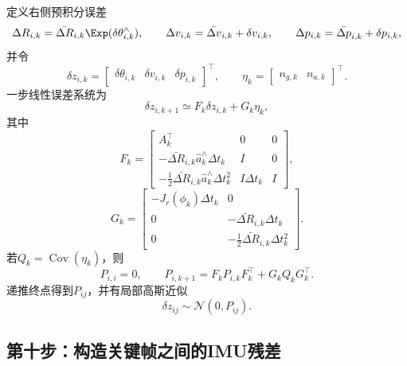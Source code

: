 定义右侧预积分误差
\[
    \Delta R_{i,k}
    =\bar{\Delta R}_{i,k}\Exp(\delta\theta_{i,k}^\wedge),
    \qquad
    \Delta v_{i,k}=\bar{\Delta v}_{i,k}+\delta v_{i,k},
    \qquad
    \Delta p_{i,k}=\bar{\Delta p}_{i,k}+\delta p_{i,k},
\]
并令
\[
    \delta z_{i,k}
    =\begin{bmatrix}\delta\theta_{i,k}&\delta v_{i,k}&\delta p_{i,k}\end{bmatrix}^\top,
    \qquad
    \eta_k
    =\begin{bmatrix}n_{g,k}&n_{a,k}\end{bmatrix}^\top.
\]
一步线性误差系统为
\[
    \delta z_{i,k+1}
    \simeq F_k\delta z_{i,k}+G_k\eta_k,
\]
其中
\[
\boxed{
F_k=
\begin{bmatrix}
    A_k^\top & 0 & 0\\
    -\bar{\Delta R}_{i,k}\widehat a_k^\wedge\Delta t_k
        & I & 0\\
    -\frac12\bar{\Delta R}_{i,k}\widehat a_k^\wedge\Delta t_k^2
        & I\Delta t_k & I
\end{bmatrix},
}
\]
\[
\boxed{
G_k=
\begin{bmatrix}
    -J_r(\phi_k)\Delta t_k & 0\\
    0 & -\bar{\Delta R}_{i,k}\Delta t_k\\
    0 & -\frac12\bar{\Delta R}_{i,k}\Delta t_k^2
\end{bmatrix}.
}
\]
若$Q_k=\operatorname{Cov}(\eta_k)$，则
\[
\boxed{
    P_{i,i}=0,
    \qquad
    P_{i,k+1}=F_kP_{i,k}F_k^\top+G_kQ_kG_k^\top.
}
\]
递推终点得到$P_{ij}$，并有局部高斯近似
\[
    \delta z_{ij}\sim\mathcal N(0,P_{ij}).
\]

\subsection*{第十步：构造关键帧之间的IMU残差}

